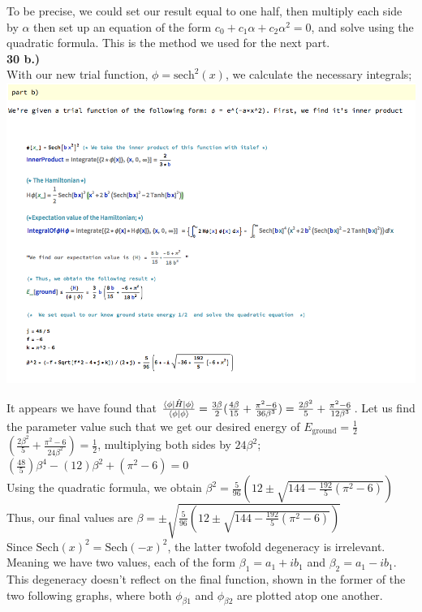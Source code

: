 \documentclass[12pt]{article}
\begin{document}
To be precise, we could set our result equal to one half, then multiply each side by $\alpha$ then set up an equation of the form $c_0+c_1\alpha+c_2\alpha^2=0$, and solve using the quadratic formula. This is the method we used for the next part.\\

\textbf{30 b.)}\\

With our new trial function, $\phi=\text{sech}^2(x)$, we calculate the necessary integrals;\\

\includegraphics[width=\linewidth]{blart6.png}

It appears we have found that $\frac{\braket{\phi|\hat{H}|\phi}}{\braket{\phi|\phi}}=\frac{3\beta}{2}(\frac{4\beta}{15}+\frac{\pi^2-6}{36\beta^3})=\frac{2\beta^2}{5}+\frac{\pi^2-6}{12\beta^3}$. Let us find the parameter value such that we get our desired energy of $E_{\text{ground}}=\frac12$\\

$(\frac{2\beta^2}{5}+\frac{\pi^2-6}{24\beta^2})=\frac12$, multiplying both sides by $ 24\beta^2 $; $ (\frac{48}{5})\beta^4-(12)\beta^2+(\pi^2-6)=0 $\\

Using the quadratic formula, we obtain $\beta^2=\frac{5}{96}(12\pm\sqrt{144-\frac{192}{5}(\pi^2-6)})$\\

Thus, our final values are $\beta=\pm\sqrt{\frac{5}{96}(12\pm\sqrt{144-\frac{192}{5}(\pi^2-6)})}$\\

Since $\text{Sech}(x)^2=\text{Sech}(-x)^2$, the latter twofold degeneracy is irrelevant. Meaning we have two values, each of the form $\beta_1=a_1+ib_1$ and $\beta_2=a_1-ib_1$. This degeneracy doesn't reflect on the final function, shown in the former of the two following graphs, where both $\phi_{\beta1}$ and $\phi_{\beta2}$ are plotted atop one another.\\
\end{document}
